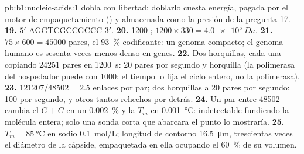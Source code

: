 \begin{solution}{pb:b1:nucleic-acids:1}
dobla con libertad: doblarlo cuesta energía, pagada por el motor de
empaquetamiento () y almacenada como la presión de la pregunta 17.
\textbf{19.} $5'$-AGGTCGCCGCCC-$3'$.
\textbf{20.} \num{1200} ; $1200\times 330 = \qty{4.0e5}{Da}$.
\textbf{21.} $75\times 600 = \num{45000}$ pares, el \qty{93}{\%}
codificante: un genoma compacto; el genoma humano es sesenta veces menos
denso en genes.
\textbf{22.} Dos horquillas, cada una copiando \num{24251} pares en
\qty{1200}{s}: \qty{20}{} pares por segundo y horquilla (la polimerasa del
hospedador puede con \qty{1000}{}; el tiempo lo fija el ciclo entero, no la
polimerasa).
\textbf{23.} $\num{121207}/\num{48502} = 2.5$ enlaces por par; dos horquillas a 20 pares por segundo: 100  por segundo, y otros tantos rehechos por detrás.
\textbf{24.} Un par entre \num{48502} cambia el $G + C$ en un
\qty{0.002}{\%} y la $T_m$ en \qty{0.001}{\celsius}: indetectable fundiendo
la molécula entera; solo una sonda corta que abarcara el punto lo
mostraría.
\textbf{25.} $T_m = \qty{85}{\celsius}$ en sodio \qty{0.1}{mol/L}; longitud
de contorno \qty{16.5}{\micro m}, trescientas veces el diámetro de la
cápside, empaquetada en ella ocupando el \qty{60}{\%} de su volumen.
\end{solution}
